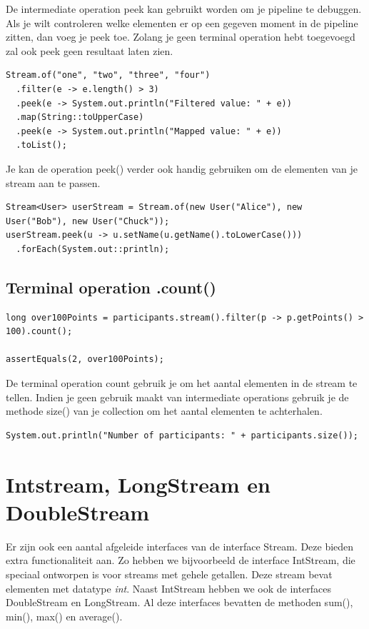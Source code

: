 De intermediate operation peek kan gebruikt worden om je pipeline te debuggen. Als je wilt controleren welke elementen er op een gegeven moment in de pipeline zitten, dan voeg je peek toe. Zolang je geen terminal operation hebt toegevoegd zal ook peek geen resultaat laten zien.

\begin{lstlisting}
Stream.of("one", "two", "three", "four")
  .filter(e -> e.length() > 3)
  .peek(e -> System.out.println("Filtered value: " + e))
  .map(String::toUpperCase)
  .peek(e -> System.out.println("Mapped value: " + e))
  .toList();
\end{lstlisting}

Je kan de operation peek() verder ook handig gebruiken om de elementen van je stream aan te passen.

\begin{lstlisting}
Stream<User> userStream = Stream.of(new User("Alice"), new User("Bob"), new User("Chuck"));
userStream.peek(u -> u.setName(u.getName().toLowerCase()))
  .forEach(System.out::println);
  \end{lstlisting}


\subsection{Terminal operation .count()}

\begin{lstlisting}
long over100Points = participants.stream().filter(p -> p.getPoints() > 100).count();

assertEquals(2, over100Points);
\end{lstlisting}
		
De terminal operation count gebruik je om het aantal elementen in de stream te tellen.
Indien je geen gebruik maakt van intermediate operations gebruik je de methode size() van je collection om het aantal elementen te achterhalen.

\begin{lstlisting}
System.out.println("Number of participants: " + participants.size());
\end{lstlisting}
		
\section{Intstream, LongStream en DoubleStream}
	
Er zijn ook een aantal afgeleide interfaces van de interface Stream. Deze bieden extra functionaliteit aan. Zo hebben we bijvoorbeeld de interface IntStream, die speciaal ontworpen is voor streams met gehele getallen. Deze stream bevat elementen met datatype \textit{int}. Naast IntStream hebben we ook de interfaces DoubleStream en LongStream. Al deze interfaces bevatten de methoden sum(), min(), max() en average(). 

